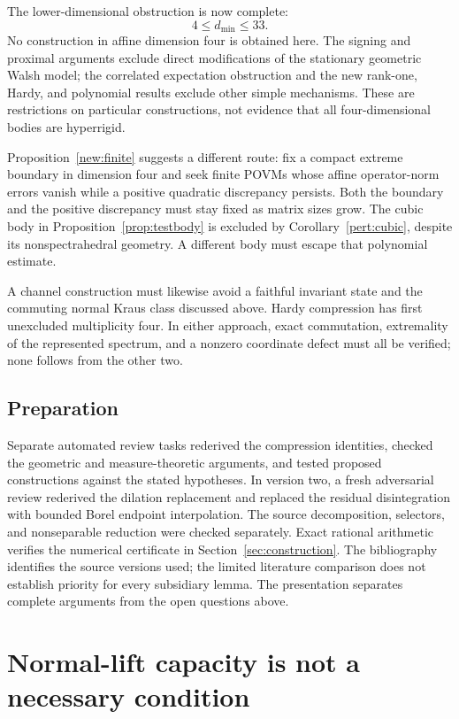 \documentclass[11pt,letterpaper]{amsart}
\theoremstyle{definition}
\theoremstyle{remark}
\numberwithin{equation}{section}
\begin{document}
The lower-dimensional obstruction is now complete:
\[
                         4\le d_{\min}\le33.
\]
No construction in affine dimension four is obtained here. The signing
and proximal arguments exclude direct modifications of the stationary
geometric Walsh model; the correlated expectation obstruction and the
new rank-one, Hardy, and polynomial results exclude other simple
mechanisms. These are restrictions on particular constructions, not
evidence that all four-dimensional bodies are hyperrigid.

Proposition~\ref{new:finite} suggests a different route: fix a compact
extreme boundary in dimension four and seek finite POVMs whose affine
operator-norm errors vanish while a positive quadratic discrepancy
persists. Both the boundary and the positive discrepancy must stay
fixed as matrix sizes grow. The cubic body in
Proposition~\ref{prop:testbody} is excluded by
Corollary~\ref{pert:cubic}, despite its nonspectrahedral geometry.
A different body must escape that polynomial estimate.

A channel construction must likewise avoid a faithful invariant state
and the commuting normal Kraus class discussed above. Hardy compression
has first unexcluded multiplicity four. In either approach, exact
commutation, extremality of the represented spectrum, and a nonzero
coordinate defect must all be verified; none follows from the other two.

\subsection*{Preparation}
Separate automated review tasks rederived the compression
identities, checked the geometric and measure-theoretic arguments,
and tested proposed constructions against the stated hypotheses. In
version two, a fresh adversarial review rederived the dilation
replacement and replaced the residual disintegration with bounded Borel
endpoint interpolation. The source decomposition, selectors, and
nonseparable reduction were checked separately.
Exact rational arithmetic verifies the numerical certificate in
Section~\ref{sec:construction}.
The bibliography identifies the source versions used; the limited
literature comparison does not establish priority for every subsidiary
lemma. The presentation separates complete arguments from the open
questions above.

\appendix
\section{Normal-lift capacity is not a necessary condition}
\label{app:capacity}
\end{document}
